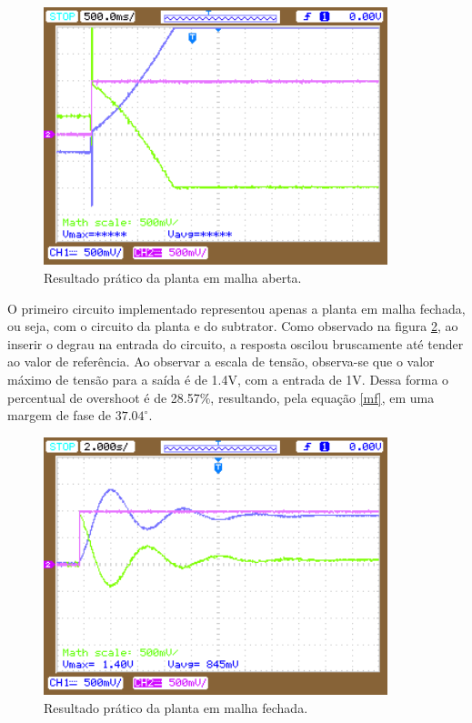 \begin{figure}[h!]
\begin{center}
    \includegraphics[width=10cm]{images/PD_pratico/ol1.png}  
\end{center}
\caption{Resultado prático da planta em malha aberta.}
\label{res:pd1} 
\end{figure}

O primeiro circuito implementado representou apenas a planta em malha fechada, ou seja, com o circuito da planta e do subtrator. Como observado na figura \ref{res:pd2}, ao inserir o degrau na entrada do circuito, a resposta oscilou bruscamente até tender ao valor de referência. Ao observar a escala de tensão, observa-se que o valor máximo de tensão para a saída é de 1.4V, com a entrada de 1V. Dessa forma o percentual de overshoot é de 28.57\%, resultando, pela equação \ref{mf}, em uma margem de fase de $37.04^{\circ}$.

\begin{figure}[h!]
\begin{center}
    \includegraphics[width=10cm]{images/PD_pratico/cl1.png}  
\end{center}
\caption{Resultado prático da planta em malha fechada.}
\label{res:pd2} 
\end{figure}

